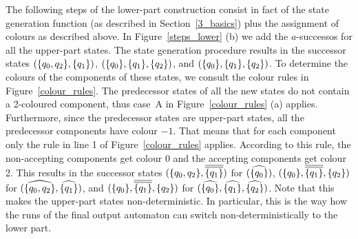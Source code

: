 The following steps of the lower-part construction consist in fact of the state generation function (as described in Section~\ref{3_basics}) plus the assignment of colours as described above. In Figure~\ref{steps_lower} (b) we add the $a$-successos for all the upper-part states. The state generation procedure results in the successor states $(\{q_{0},q_{2}\}, \{q_{1}\})$, $(\{q_{0}\}, \{q_{1}\}, \{q_{2}\})$, and $(\{q_{0}\}, \{q_{1}\}, \{q_{2}\})$. To determine the colours of the components of these states, we consult the colour rules in Figure~\ref{colour_rules}. The predecessor states of all the new states do not contain a 2-coloured component, thus case~A in Figure~\ref{colour_rules} (a) applies. Furthermore, since the predecessor states are upper-part states, all the predecessor components have colour $-1$. That means that for each component only the rule in line 1 of Figure~\ref{colour_rules} applies. According to this rule, the non-accepting components get colour 0 and the accepting components get colour 2. This results in the successor states $(\qqm02, \cl2{\qm1})$ for $(\cl^{\qm0})$, $(\qm0, \cl2{\qm1}, \qm2)$ for $(\cl^{\qqm02}, \cl^{\qm1})$, and $(\qm0, \cl2{\qm1}, \qm2)$ for $(\cl^{\qm0}, \cl^{\qm1}, \cl^{\qm2})$. Note that this makes the upper-part states non-deterministic. In particular, this is the way how the runs of the final output automaton can switch non-deterministically to the lower part. 



